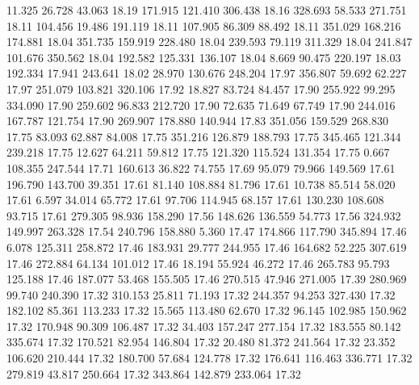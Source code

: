   11.325   26.728   43.063        18.19
 171.915  121.410  306.438        18.16
 328.693   58.533  271.751        18.11
 104.456   19.486  191.119        18.11
 107.905   86.309   88.492        18.11
 351.029  168.216  174.881        18.04
 351.735  159.919  228.480        18.04
 239.593   79.119  311.329        18.04
 241.847  101.676  350.562        18.04
 192.582  125.331  136.107        18.04
   8.669   90.475  220.197        18.03
 192.334   17.941  243.641        18.02
  28.970  130.676  248.204        17.97
 356.807   59.692   62.227        17.97
 251.079  103.821  320.106        17.92
  18.827   83.724   84.457        17.90
 255.922   99.295  334.090        17.90
 259.602   96.833  212.720        17.90
  72.635   71.649   67.749        17.90
 244.016  167.787  121.754        17.90
 269.907  178.880  140.944        17.83
 351.056  159.529  268.830        17.75
  83.093   62.887   84.008        17.75
 351.216  126.879  188.793        17.75
 345.465  121.344  239.218        17.75
  12.627   64.211   59.812        17.75
 121.320  115.524  131.354        17.75
   0.667  108.355  247.544        17.71
 160.613   36.822   74.755        17.69
  95.079   79.966  149.569        17.61
 196.790  143.700   39.351        17.61
  81.140  108.884   81.796        17.61
  10.738   85.514   58.020        17.61
   6.597   34.014   65.772        17.61
  97.706  114.945   68.157        17.61
 130.230  108.608   93.715        17.61
 279.305   98.936  158.290        17.56
 148.626  136.559   54.773        17.56
 324.932  149.997  263.328        17.54
 240.796  158.880    5.360        17.47
 174.866  117.790  345.894        17.46
   6.078  125.311  258.872        17.46
 183.931   29.777  244.955        17.46
 164.682   52.225  307.619        17.46
 272.884   64.134  101.012        17.46
  18.194   55.924   46.272        17.46
 265.783   95.793  125.188        17.46
 187.077   53.468  155.505        17.46
 270.515   47.946  271.005        17.39
 280.969   99.740  240.390        17.32
 310.153   25.811   71.193        17.32
 244.357   94.253  327.430        17.32
 182.102   85.361  113.233        17.32
  15.565  113.480   62.670        17.32
  96.145  102.985  150.962        17.32
 170.948   90.309  106.487        17.32
  34.403  157.247  277.154        17.32
 183.555   80.142  335.674        17.32
 170.521   82.954  146.804        17.32
  20.480   81.372  241.564        17.32
  23.352  106.620  210.444        17.32
 180.700   57.684  124.778        17.32
 176.641  116.463  336.771        17.32
 279.819   43.817  250.664        17.32
 343.864  142.879  233.064        17.32
